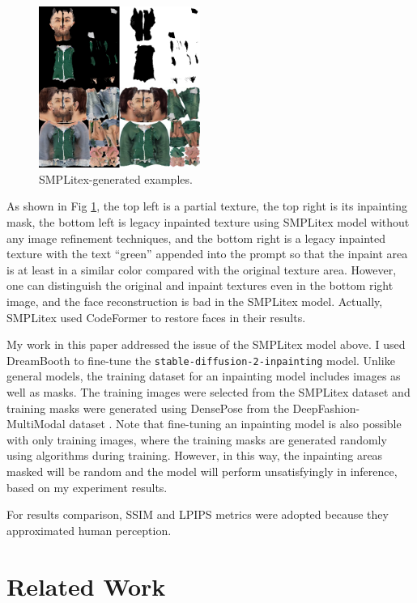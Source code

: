 \documentclass[acmtog]{acmart}
\begin{document}
\begin{figure}[h]
  \centering
  \includegraphics[width=0.47\textwidth]{figs/smplitex_sample.png}
  \caption{SMPLitex-generated examples.}
  \label{fig:smplitex_sample}
\end{figure}

As shown in Fig \ref{fig:smplitex_sample}, the top left is a partial texture, the top right is its inpainting mask, the bottom left is legacy inpainted texture using SMPLitex model without any image refinement techniques, and the bottom right is a legacy inpainted texture with the text ``green'' appended into the prompt so that the inpaint area is at least in a similar color compared with the original texture area. However, one can distinguish the original and inpaint textures even in the bottom right image, and the face reconstruction is bad in the SMPLitex model. Actually, SMPLitex used CodeFormer \cite{zhou2022towards} to restore faces in their results.

My work in this paper addressed the issue of the SMPLitex model above. I used DreamBooth to fine-tune the \texttt{stable-diffusion-2-inpainting} model. Unlike general models, the training dataset for an inpainting model includes images as well as masks. The training images were selected from the SMPLitex dataset and training masks were generated using DensePose from the DeepFashion-MultiModal dataset \cite{jiang2022text2human}. Note that fine-tuning an inpainting model is also possible with only training images, where the training masks are generated randomly using algorithms during training. However, in this way, the inpainting areas masked will be random and the model will perform unsatisfyingly in inference, based on my experiment results.

For results comparison, SSIM and LPIPS metrics were adopted because they approximated human perception.

\section{Related Work}
\end{document}
